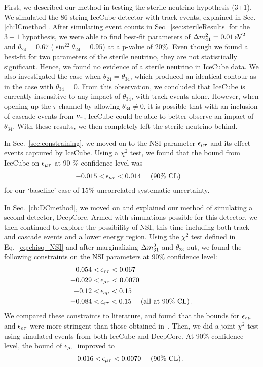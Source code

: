 First, we described our method in testing the sterile neutrino hypothesis (3+1). We simulated the 86 string IceCube detector with track events, explained in Sec.\ref{ch:ICmethod}.
After simulating event counts in Sec.~\ref{sec:sterileResults} for the $3+1$ hypothesis, we were able to find best-fit parameters of 
$\dm[41] = \SI{0.01}{\eV^2}$ and $\theta_{24} = 0.67$ ($\sin^22\theta_{24} = 0.95$) at 
a p-value of $20\%$. Even though we found a best-fit for two parameters of the sterile neutrino, they are not statistically significant. Hence, we found no evidence of a sterile neutrino in IceCube data.
We also investigated the case when $\theta_{24} = \theta_{34}$, which produced an identical contour as in the case with $\theta_{34}=0$. From this observation, 
we concluded that IceCube is currently insensitive to any impact of $\theta_{34}$, with track events alone. However,
when opening up the $\tau$ channel by allowing $\theta_{34} \neq 0$, it is possible that with an inclusion of cascade events from $\nu_\tau$, IceCube could be able to better observe 
an impact of $\theta_{34}$. With these results, we then completely left the sterile neutrino behind.

In Sec.~\ref{sec:constraining}, we moved on to the NSI parameter $\epsilon_{\mu\tau}$ and its effect events captured by IceCube. 
Using a $\chi^2$ test, we found that the bound from IceCube on $\epsilon_{\mu\tau}$ at 90 \% confidence level was 
\begin{align}
    -0.015 <\,& \epsilon_{\mu\tau} < 0.014\ \quad (90\% \text{ CL})
\end{align}
for our `baseline' case of 15\% uncorrelated systematic uncertainty.

In Sec.~\ref{ch:DCmethod}, we moved on and explained our method of simulating a second detector, DeepCore. Armed with simulations possible for this detector, we then continued to explore the possibility of NSI, this time including both track and cascade events and a lower energy region.
Using the $\chi^2$ test defined in Eq.~\ref{eq:chisq_NSI} and after marginalizing $\dm[31]$ and $\theta_{23}$ out, we found the following constraints on the NSI parameters at 90\% confidence level:
\begin{align}
    -0.054 <&\, \epsilon_{\tau\tau} < 0.067 \nonumber \\
    -0.029 <&\, \epsilon_{\mu\tau} < 0.0070 \nonumber \\
    -0.12 <&\, \epsilon_{e\mu} < 0.15 \nonumber \\
    -0.084 <&\, \epsilon_{e\tau} < 0.15\ \quad (\text{all at }90\% \text{ CL})\,.
 \end{align}
We compared these constraints to literature, and found that the bounds for $\epsilon_{e\mu}$ and $\epsilon_{e\tau}$ were more stringent than those obtained in~\cite{demidov}.
Then, we did a joint $\chi^2$ test using simulated events from both IceCube and DeepCore. At 90\% confidence level, the bound of $\epsilon_{\mu\tau}$ improved to
\begin{align}
    -0.016 <&\, \epsilon_{\mu\tau} < 0.0070\ \quad (90\% \text{ CL})\,.
 \end{align}


